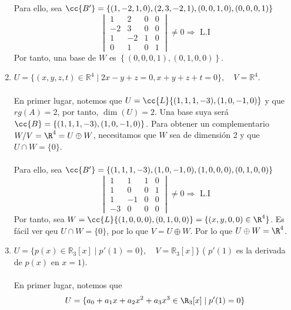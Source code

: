 \begin{ejercicio}
\begin{enumerate}[label=\alph*)]
		      Para ello, sea $\cc{B'} = \left\{(1,-2, 1, 0), (2,3, -2, 1), (0,0,1,0), (0,0,0,1)\right\}$
		      \begin{equation*}
			      \begin{vmatrix}
				      1  & 2  & 0 & 0 \\
				      -2 & 3  & 0 & 0 \\
				      1  & -2 & 1 & 0 \\
				      0  & 1  & 0 & 1
			      \end{vmatrix} \neq 0 \Rightarrow \text{ L.I}
		      \end{equation*}
		      Por tanto, una base de $W$ es $\left\{ (0, 0, 0, 1), (0, 1, 0, 0) \right\}$.
		\item \( U = \{ (x,y,z,t) \in \mathbb{R}^4 \mid 2x - y + z = 0, x + y + z + t = 0 \}, \quad V = \mathbb{R}^4 \).
		      \\ \\ En primer lugar, notemos que $U = \cc{L}\{(1, 1, 1, -3), (1, 0, -1, 0)\}$ y que $rg(A) = 2$, por tanto, $\dim(U) = 2$.
		      Una base suya será $\cc{B} = \{(1, 1, 1, -3), (1, 0, -1, 0)\}$.
		      Para obtener un complementario $W / V = \R^4 = U \oplus W$, necesitamos que $W$ sea de dimensión 2 y que $U \cap W = \{0\}$.
		      \\ \\ Para ello, sea $\cc{B'} = \left\{(1, 1, 1, -3), (1, 0, -1, 0), (1, 0, 0, 0), (0, 1, 0, 0)\right\}$
		      \begin{equation*}
			      \begin{vmatrix}
				      1  & 1  & 1 & 0 \\
				      1  & 0  & 0 & 1 \\
				      1  & -1 & 0 & 0 \\
				      -3 & 0  & 0 & 0
			      \end{vmatrix} \neq 0 \Rightarrow \text{ L.I}
		      \end{equation*}
		      Por tanto, sea $W = \cc{L}    \{(1, 0, 0, 0), (0, 1, 0, 0)\} = \{ (x, y, 0, 0) \in \R^4 \}$.
		      Es fácil ver qeu $U \cap W = \{0\}$, por lo que $V = U \oplus W$. Por lo que $U \oplus W = \R^4$.
		\item \( U = \{ p(x) \in \mathbb{R}_3[x] \mid p'(1) = 0 \}, \quad V = \mathbb{R}_3[x] \} \) ( \( p'(1) \) es la derivada de \( p(x) \) en \( x = 1 \)).
		\\ \\ En primer lugar, notemos que
        \begin{align*}
            U &= \{ a_0 + a_1 x + a_2 x^2 + a_3 x^3 \in \R_3[x] \mid p'(1) = 0 \} \\

\end{align*}
\end{enumerate}
\end{ejercicio}
